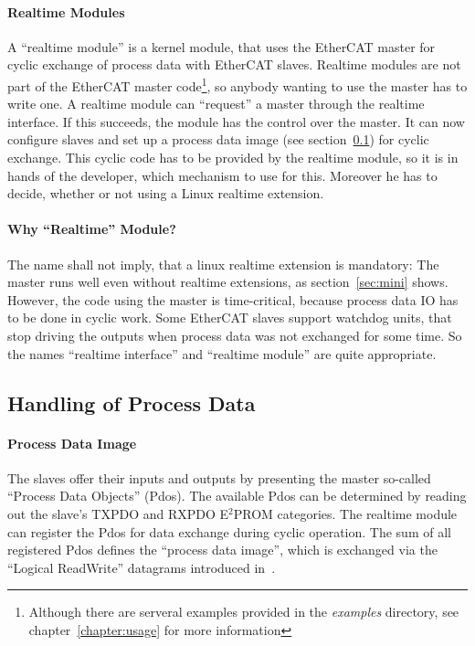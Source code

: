 \documentclass[a4paper,12pt,BCOR6mm,bibtotoc,idxtotoc]{scrbook}
\begin{document}
\paragraph{Realtime Modules}

A ``realtime module'' is a kernel module, that
uses the EtherCAT master for cyclic exchange of process data with
EtherCAT slaves. Realtime modules are not part of the EtherCAT master
code\footnote{Although there are serveral examples provided in the
  \textit{examples} directory, see chapter~\ref{chapter:usage} for
  more information}, so anybody wanting to use the master has to write
one. A realtime module can ``request'' a master through the realtime
interface. If this succeeds, the module has the control over the
master. It can now configure slaves and set up a process data image
(see section~\ref{sec:processdata}) for cyclic exchange. This cyclic
code has to be provided by the realtime module, so it is in hands of
the developer, which mechanism to use for this. Moreover he has to
decide, whether or not using a Linux realtime extension.

\paragraph{Why ``Realtime'' Module?}

The name shall not imply, that a linux realtime extension is
mandatory: The master runs well even without realtime extensions, as
section~\ref{sec:mini} shows. However, the code using the master is
time-critical, because process data IO has to be done in cyclic work.
Some EtherCAT slaves support watchdog units, that stop driving the
outputs when process data was not exchanged for some time. So the
names ``realtime interface'' and ``realtime module'' are quite
appropriate.


\subsection{Handling of Process Data}
\label{sec:processdata}

\paragraph{Process Data Image}

The slaves offer their inputs and outputs by presenting the master
so-called ``Process Data Objects'' (Pdos). The available
Pdos can be determined by reading out the slave's TXPDO and RXPDO
E$^2$PROM categories. The realtime module can register the Pdos for
data exchange during cyclic operation. The sum of all registered Pdos
defines the ``process data image'', which is exchanged via the
``Logical ReadWrite'' datagrams introduced
in~\cite[section~5.4.2.4]{dlspec}.
\end{document}
